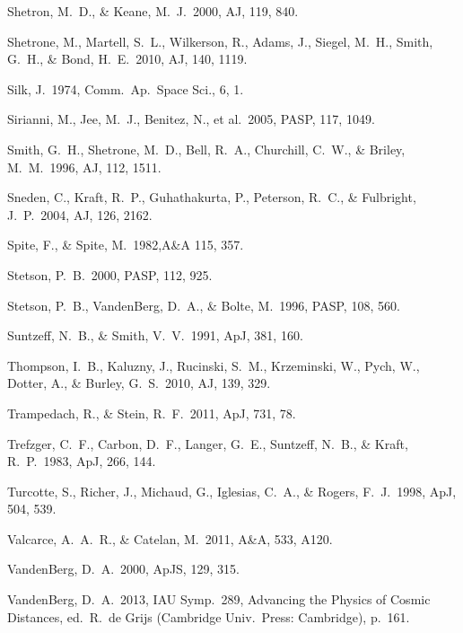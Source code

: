 \documentclass[12pt,preprint]{aastex}
\begin{document}
\begin{thebibliography}{}
Shetron, M.~D., \& Keane, M.~J.~2000, AJ, 119, 840.

Shetrone, M., Martell, S.~L., Wilkerson, R., Adams, J., Siegel, M.~H., Smith,
 G.~H., \& Bond, H.~E.~2010, AJ, 140, 1119.

Silk, J.~1974, Comm.~Ap.~Space Sci., 6, 1.

Sirianni, M., Jee, M.~J., Benitez, N., et al.~2005, PASP, 117, 1049.

Smith, G.~H., Shetrone, M.~D., Bell, R.~A., Churchill, C.~W., \& Briley,
 M.~M.~1996, AJ, 112, 1511.

Sneden, C., Kraft, R.~P., Guhathakurta, P., Peterson, R.~C., \& Fulbright,
 J.~P.~2004, AJ, 126, 2162.

Spite, F., \& Spite, M.~1982,A\&A 115, 357.

%
Stetson, P.~B.~2000, PASP, 112, 925.

%
Stetson, P.~B., VandenBerg, D.~A., \& Bolte, M.~1996, PASP, 108, 560.

Suntzeff, N.~B., \& Smith, V.~V.~1991, ApJ, 381, 160.

Thompson, I.~B., Kaluzny, J., Rucinski, S.~M., Krzeminski, W., Pych, W.,
 Dotter, A., \& Burley, G.~S.~2010, AJ, 139, 329.

Trampedach, R., \& Stein, R.~F.~2011, ApJ, 731, 78.

Trefzger, C.~F., Carbon, D.~F., Langer, G.~E., Suntzeff, N.~B., \& Kraft,
 R.~P.~1983, ApJ, 266, 144.

Turcotte, S., Richer, J., Michaud, G., Iglesias, C.~A., \& Rogers, F.~J.~1998,
 ApJ, 504, 539.

Valcarce, A.~A.~R., \& Catelan, M.~2011, A\&A, 533, A120.

VandenBerg, D.~A.~2000, ApJS, 129, 315.

VandenBerg, D.~A.~2013, IAU Symp.~289, Advancing the Physics of Cosmic
 Distances, ed.~R.~de Grijs (Cambridge Univ.~Press: Cambridge), p.~161.


\end{thebibliography}
\end{document}
